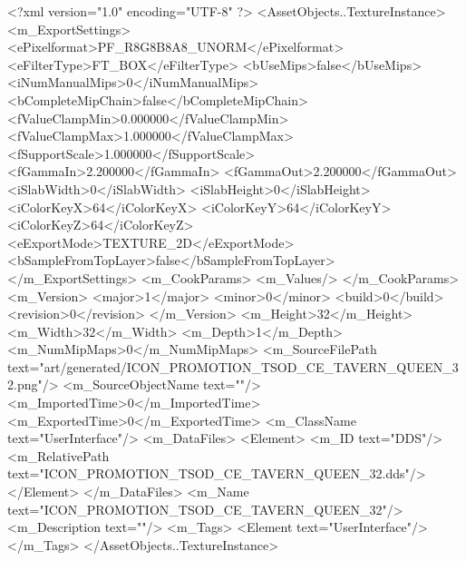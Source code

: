 <?xml version="1.0" encoding="UTF-8" ?>
<AssetObjects..TextureInstance>
	<m_ExportSettings>
		<ePixelformat>PF_R8G8B8A8_UNORM</ePixelformat>
		<eFilterType>FT_BOX</eFilterType>
		<bUseMips>false</bUseMips>
		<iNumManualMips>0</iNumManualMips>
		<bCompleteMipChain>false</bCompleteMipChain>
		<fValueClampMin>0.000000</fValueClampMin>
		<fValueClampMax>1.000000</fValueClampMax>
		<fSupportScale>1.000000</fSupportScale>
		<fGammaIn>2.200000</fGammaIn>
		<fGammaOut>2.200000</fGammaOut>
		<iSlabWidth>0</iSlabWidth>
		<iSlabHeight>0</iSlabHeight>
		<iColorKeyX>64</iColorKeyX>
		<iColorKeyY>64</iColorKeyY>
		<iColorKeyZ>64</iColorKeyZ>
		<eExportMode>TEXTURE_2D</eExportMode>
		<bSampleFromTopLayer>false</bSampleFromTopLayer>
	</m_ExportSettings>
	<m_CookParams>
		<m_Values/>
	</m_CookParams>
	<m_Version>
		<major>1</major>
		<minor>0</minor>
		<build>0</build>
		<revision>0</revision>
	</m_Version>
	<m_Height>32</m_Height>
	<m_Width>32</m_Width>
	<m_Depth>1</m_Depth>
	<m_NumMipMaps>0</m_NumMipMaps>
	<m_SourceFilePath text="art/generated/ICON_PROMOTION_TSOD_CE_TAVERN_QUEEN_32.png"/>
	<m_SourceObjectName text=""/>
	<m_ImportedTime>0</m_ImportedTime>
	<m_ExportedTime>0</m_ExportedTime>
	<m_ClassName text="UserInterface"/>
	<m_DataFiles>
		<Element>
			<m_ID text="DDS"/>
			<m_RelativePath text="ICON_PROMOTION_TSOD_CE_TAVERN_QUEEN_32.dds"/>
		</Element>
	</m_DataFiles>
	<m_Name text="ICON_PROMOTION_TSOD_CE_TAVERN_QUEEN_32"/>
	<m_Description text=""/>
	<m_Tags>
		<Element text="UserInterface"/>
	</m_Tags>
</AssetObjects..TextureInstance>
